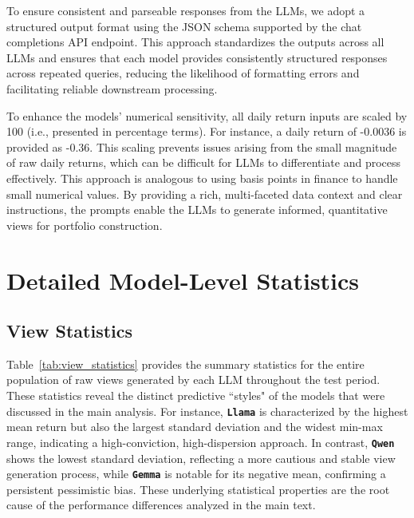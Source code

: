 To ensure consistent and parseable responses from the LLMs, we adopt a structured output format using the JSON schema supported by the chat completions API endpoint. This approach standardizes the outputs across all LLMs and ensures that each model provides consistently structured responses across repeated queries, reducing the likelihood of formatting errors and facilitating reliable downstream processing.

To enhance the models' numerical sensitivity, all daily return inputs are scaled by 100 (i.e., presented in percentage terms). For instance, a daily return of -0.0036 is provided as -0.36. This scaling prevents issues arising from the small magnitude of raw daily returns, which can be difficult for LLMs to differentiate and process effectively. This approach is analogous to using basis points in finance to handle small numerical values. By providing a rich, multi-faceted data context and clear instructions, the prompts enable the LLMs to generate informed, quantitative views for portfolio construction.


\section{Detailed Model-Level Statistics} \label{appendix:LLM}

\subsection{View Statistics}

Table~\ref{tab:view_statistics} provides the summary statistics for the entire population of raw views generated by each LLM throughout the test period. These statistics reveal the distinct predictive ``styles" of the models that were discussed in the main analysis. For instance, \textbf{\texttt{Llama}} is characterized by the highest mean return but also the largest standard deviation and the widest min-max range, indicating a high-conviction, high-dispersion approach. In contrast, \textbf{\texttt{Qwen}} shows the lowest standard deviation, reflecting a more cautious and stable view generation process, while \textbf{\texttt{Gemma}} is notable for its negative mean, confirming a persistent pessimistic bias. These underlying statistical properties are the root cause of the performance differences analyzed in the main text.

